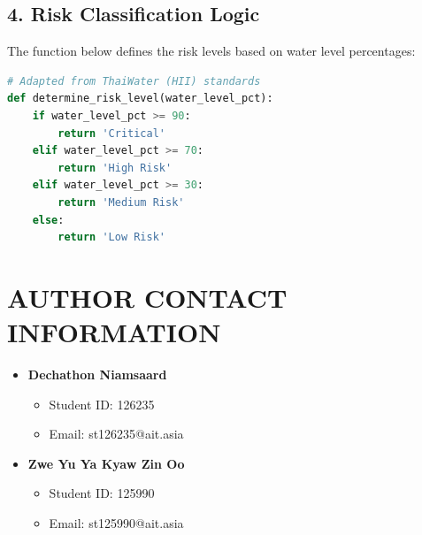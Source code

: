 \newpage
\section*{4. Risk Classification Logic}
The function below defines the risk levels based on water level percentages:
\begin{lstlisting}[language=Python, caption=Risk Classification Logic]
# Adapted from ThaiWater (HII) standards
def determine_risk_level(water_level_pct):
    if water_level_pct >= 90:
        return 'Critical'
    elif water_level_pct >= 70:
        return 'High Risk'
    elif water_level_pct >= 30:
        return 'Medium Risk'
    else:
        return 'Low Risk'
\end{lstlisting}

\newpage
{}
{}
\stoptocwriting
\chapter{AUTHOR CONTACT INFORMATION}
\resumetocwriting

\begin{itemize}
    \item \textbf{Dechathon Niamsaard}
    \begin{itemize}
        \item Student ID: 126235
        \item Email: st126235@ait.asia
    \end{itemize}
    
    \item \textbf{Zwe Yu Ya Kyaw Zin Oo}
    \begin{itemize}
        \item Student ID: 125990
        \item Email: st125990@ait.asia
    \end{itemize}
\end{itemize}

